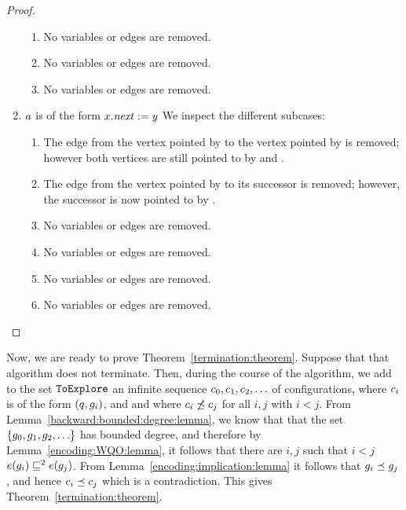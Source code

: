 \begin{proof}
\begin{enumerate}
\begin{enumerate}
\item No variables or edges are removed.
\item No variables or edges are removed.
\item No variables or edges are removed.
\end{enumerate}
\item $a$ is of the form $x.{\it next}:=y$
%
We inspect the different subcases:
\begin{enumerate}
\item The edge from the vertex pointed by \xvar to the vertex pointed by \yvar is removed; 
  however both vertices are still pointed to by \xvar and \yvar.
\item The edge from the vertex pointed by \xvar to its successor is removed; 
however, the successor is now pointed to by \yvar.
\item No variables or edges are removed.
\item No variables or edges are removed.
\item No variables or edges are removed.
\item No variables or edges are removed.
\end{enumerate}
\end{enumerate}
\end{proof}


Now, we are ready to prove Theorem~\ref{termination:theorem}.
%
Suppose that that algorithm does not terminate.
%
Then, during the course of the algorithm, we add to the set
${\tt ToExplore}$ an infinite sequence $c_0,c_1,c_2,\ldots$ of configurations,
where $c_i$ is of the form $\left(q,g_i\right)$, and
and where $c_i\not\preceq c_j$ for all $i,j$ with $i<j$.
%
From Lemma~\ref{backward:bounded:degree:lemma}, we know that that 
the set $\left\{g_0,g_1,g_2,\ldots\right\}$ has bounded degree, and therefore
by Lemma~\ref{encoding:WQO:lemma}, it follows that there
are $i,j$ such that $i<j$ $e(g_i)\sqsubseteq^2e(g_j)$.
%
From Lemma~\ref{encoding:implication:lemma} it follows that
$g_i\preceq g_j$, and hence $c_i\preceq c_j$ which is a contradiction.
%
This gives Theorem~\ref{termination:theorem}.
%
